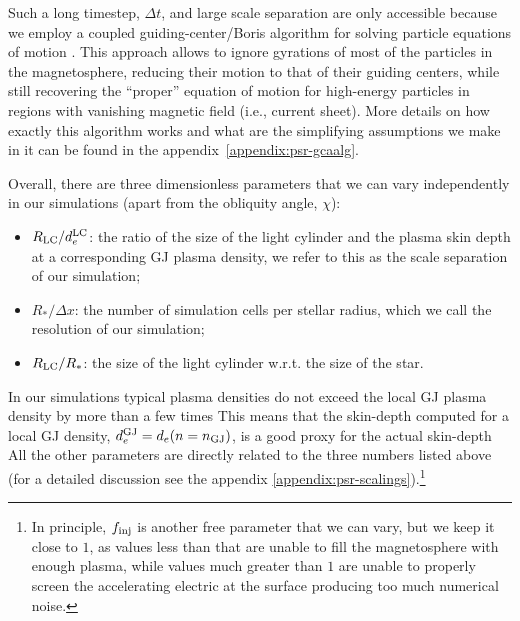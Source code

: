 Such a long timestep, $\Delta t$, and large scale separation are only accessible because we employ a coupled guiding-center/Boris algorithm for solving particle equations of motion \citep{2020ApJS..251...10B}. This approach allows to ignore gyrations of most of the particles in the magnetosphere, reducing their motion to that of their guiding centers, while still recovering the ``proper'' equation of motion for high-energy particles in regions with vanishing magnetic field (i.e., current sheet). More details on how exactly this algorithm works and what are the simplifying assumptions we make in it can be found in the appendix~\ref{appendix:psr-gcaalg}.

Overall, there are three dimensionless parameters that we can vary independently in our simulations (apart from the obliquity angle, $\chi$):
\begin{itemize}
    \item $R_{\rm LC} / d_e^{\rm LC}$: the ratio of the size of the light cylinder and the plasma skin depth at a corresponding GJ plasma density, we refer to this as the scale separation of our simulation;
    \item $R_* / \Delta x$: the number of simulation cells per stellar radius, which we call the resolution of our simulation;
    \item $R_{\rm LC} / R_*$: the size of the light cylinder w.r.t. the size of the star.
\end{itemize}
\noindent In our simulations typical plasma densities do not exceed the local GJ plasma density by more than a few times This means that the skin-depth computed for a local GJ density, $d_e^{\rm GJ} = d_e(n=n_{\rm GJ})$, is a good proxy for the actual skin-depth All the other parameters are directly related to the three numbers listed above (for a detailed discussion see the appendix \ref{appendix:psr-scalings}).\footnote{In principle, $f_{\rm inj}$ is another free parameter that we can vary, but we keep it close to $1$, as values less than that are unable to fill the magnetosphere with enough plasma, while values much greater than $1$ are unable to properly screen the accelerating electric at the surface producing too much numerical noise.}

